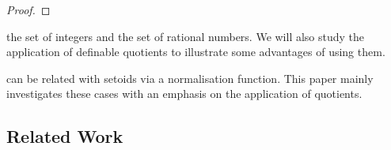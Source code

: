 \begin{proof}










\end{proof}







 the set
of integers and the set of rational numbers. We will also study the
application of definable quotients to illustrate some advantages of
using them.


 can be related with setoids via a
normalisation function. This paper mainly investigates these cases with an emphasis
on the application of quotients.















\subsection{Related Work}
\label{sec:related-work}

